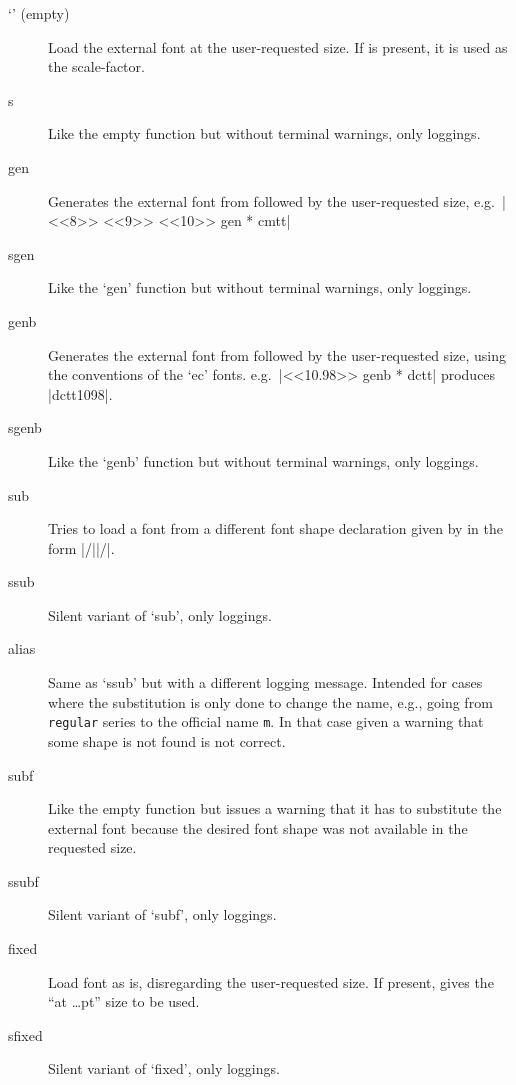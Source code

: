 \documentclass{ltxguide}[1995/11/28]
\begin{document}
\begin{description}
\item[`' (empty)]
  Load the external font  at the user-requested size. If
   is present, it is used as the scale-factor.

\item[s]
  Like the empty function but without terminal warnings, only
  loggings.

\item[gen]
  Generates the external font from  followed by the
  user-requested size, e.g.~|<<8>> <<9>> <<10>> gen * cmtt|

\item[sgen]
  Like the `gen' function but without terminal warnings, only loggings.

\item[genb]
  Generates the external font from  followed by the
  user-requested size, using the conventions of the `ec' fonts.
  e.g.~|<<10.98>> genb * dctt| produces |dctt1098|.

\item[sgenb]
  Like the `genb' function but without terminal warnings, only loggings.

\item[sub]
  Tries to load a font from a different font shape declaration given by
   in the form |/||/|.

\item[ssub]
  Silent variant of `sub', only loggings.

\item[alias]
  Same as `ssub' but with a different logging message. Intended for
  cases where the substitution is only done to change the name, e.g.,
  going from \texttt{regular} series to the official name \texttt{m}. In
  that case given a warning that some shape is not found is not correct.

\item[subf]
  Like the empty function but issues a warning that it has to substitute
  the external font  because the desired font shape was not
  available in the requested size.

\item[ssubf]
  Silent variant of `subf', only loggings.

\item[fixed]
  Load font  as is, disregarding the user-requested size.  If
  present,  gives the ``at \ldots pt'' size to be used.

\item[sfixed]
  Silent variant of `fixed', only loggings.
\end{description}
\end{document}

